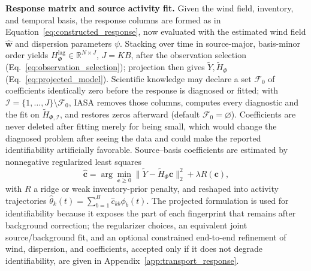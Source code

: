 \noindent\textbf{Response matrix and source activity fit.}\label{subsec:response_and_fit}
Given the wind field, inventory, and temporal basis, the response columns are
formed as in Equation~\ref{eq:constructed_response}, now evaluated with the
estimated wind field \(\widehat{\mathbf w}\) and dispersion parameters \(\psi\).
Stacking over time in source-major, basis-minor order yields
\(H_\Phi^{\mathrm{lag}}\in\mathbb R^{N\times J}\), \(J=KB\), after the observation
selection (Eq.~\ref{eq:observation_selection}); projection then gives
\(\widetilde Y,\widetilde H_\Phi\) (Eq.~\ref{eq:projected_model}).  Scientific
knowledge may declare a set \(\mathcal F_0\) of coefficients identically zero
before the response is diagnosed or fitted; with
\(\mathcal I=\{1,\ldots,J\}\setminus\mathcal F_0\), IASA removes those columns,
computes every diagnostic and the fit on \(\widetilde H_{\Phi,\mathcal I}\), and
restores zeros afterward (default \(\mathcal F_0=\varnothing\)).  Coefficients are
never deleted after fitting merely for being small, which would change the
diagnosed problem after seeing the data and could make the reported
identifiability artificially favorable.  Source--basis coefficients are
estimated by nonnegative regularized least squares
\begin{equation}
\widehat{\mathbf c}
=\arg\min_{\mathbf c\ge 0}
\|\widetilde Y-\widetilde H_\Phi\mathbf c\|_2^2
+\lambda R(\mathbf c),
\label{eq:nnls_estimator}
\end{equation}
with \(R\) a ridge or weak inventory-prior penalty, and reshaped into activity
trajectories \(\widehat\theta_k(t)=\sum_{b=1}^{B}\widehat c_{kb}\phi_b(t)\).
The projected formulation is used for identifiability because it exposes the part
of each fingerprint that remains after background correction; the regularizer
choices, an equivalent joint source/background fit, and an optional constrained
end-to-end refinement of wind, dispersion, and coefficients, accepted only if it
does not degrade identifiability, are given in
Appendix~\ref{app:transport_response}.
